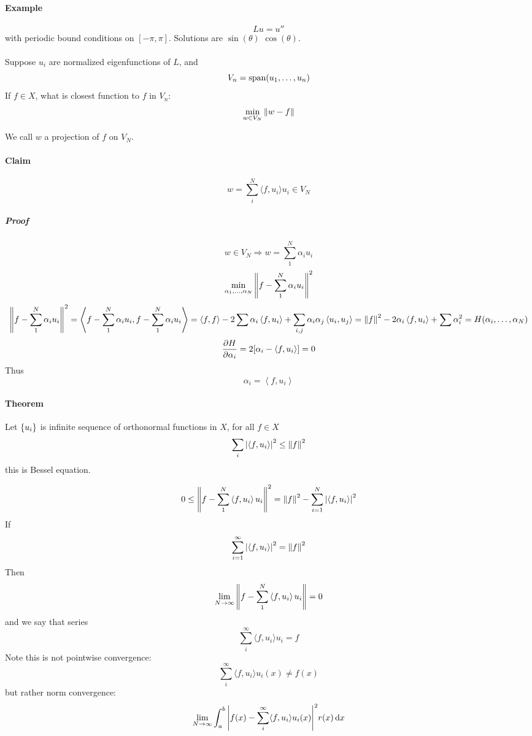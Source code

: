\paragraph{Example}
$$Lu = u''$$
with periodic bound conditions on $[-\pi, \pi]$. Solutions are $\sin(\theta)$ $\cos(\theta)$. 
\paragraph{}
Suppose $u_i$ are normalized eigenfunctions of $L$, and
$$V_n = \text{span}\qty(u_1, \dots, u_n)$$
If $f\in X$, what is closest function to $f$ in $V_n$:
$$\min\limits_{w\in V_N} \norm{w-f}$$

We call $w$ a projection of $f$ on $V_N$.
\paragraph{Claim} 
$$w = \sum_i^N \langle f, u_i\rangle u_i \in V_N$$
\subparagraph{Proof}
$$w\in V_N \Rightarrow w = \sum_1^N \alpha_i u_i$$
$$\min\limits_{\alpha_1, \dots, \alpha_N} \norm{f-\sum_1^N \alpha_i u_i}^2$$
$$\norm{f-\sum_1^N \alpha_i u_i}^2 = \left\langle  f-\sum_1^N \alpha_i u_i,f-\sum_1^N \alpha_i u_i\right\rangle = \left\langle  f,f\right\rangle - 2 \sum \alpha_i \left\langle  f,u_i\right\rangle + \sum_{i,j} \alpha_i \alpha_j \left\langle  u_i,u_j\right\rangle = \norm{f}^2 -2\alpha_i  \left\langle  f,u_i\right\rangle + \sum \alpha_i^2 = H(\alpha_i, \dots, \alpha_N)$$
$$\pdv{H}{\alpha_i} = 2[\alpha_i - \left\langle  f,u_i\right\rangle ] = 0$$
Thus
$$\alpha_i = \left\langle  f,u_i\right\rangle$$
\paragraph{Theorem}
Let $\qty{u_i}$ is infinite sequence of orthonormal functions in $X$, for all $f\in X$
$$\sum_i \abs{\left\langle  f,u_i\right\rangle}^2 \leq \norm{f}^2$$
this is Bessel equation.

$$0 \leq \norm{f- \sum_1^N \left\langle  f,u_i\right\rangle u_i }^2 = \norm{f}^2 - \sum_{i=1}^N  \abs{\left\langle  f,u_i\right\rangle}^2$$
If
$$\sum_{i=1}^\infty \abs{\left\langle  f,u_i\right\rangle}^2 = \norm{f}^2$$
Then
$$\lim_{N\to \infty} \norm{f- \sum_1^N \left\langle  f,u_i\right\rangle u_i } = 0$$
and we say that series
$$\sum_i^\infty \langle f, u_i\rangle u_i = f$$
Note this is not pointwise convergence:
$$\sum_i^\infty \langle f, u_i\rangle u_i(x) \neq f(x)$$
but rather norm convergence:
$$\lim_{N \to \infty} \int_a^b \abs{f(x) - \sum_i^\infty \langle f, u_i\rangle u_i(x)}^2 r(x) \dd{x}$$

